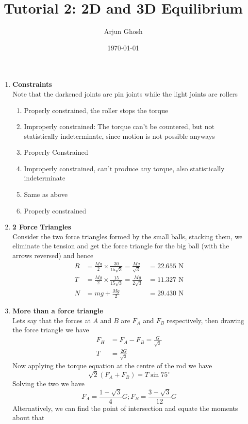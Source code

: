 \documentclass[12pt]{article}
\title{Tutorial 2: 2D and 3D Equilibrium}
\author{Arjun Ghosh}
\date{\today}
\begin{document}
\maketitle
\begin{enumerate}
\item \textbf{Constraints} \\
Note that the darkened joints are pin joints while the light joints are rollers
\begin{enumerate}
\item Properly constrained, the roller stops the torque
\item Improperly constrained: The torque can't be countered, but not statistically indeterminate, since motion is not possible anyways
\item Properly Constrained
\item Improperly constrained, can't produce any torque, also statistically indeterminate
\item Same as above
\item Properly constrained
\end{enumerate}
\item \textbf{2 Force Triangles} \\
Consider the two force triangles formed by the small balls, stacking them, we eliminate the tension and get the force triangle for the big ball (with the arrows reversed) and hence
$$
\begin{aligned}
R &= \frac{Mg}{2} \times \frac{30}{15\sqrt{ 3 }} = \frac{Mg}{\sqrt{ 3 }} & =22.655 \text{ N}\\
T &= \frac{Mg}{2}\times \frac{15}{15\sqrt{ 3 } } = \frac{Mg}{2\sqrt{ 3 }} &=11.327 \text{ N}\\
N &= mg + \frac{Mg}{2} &= 29.430 \text{ N}
\end{aligned}
$$
\item \textbf{More than a force triangle} \\
Lets say that the forces at $A$ and $B$ are $F_{A}$ and $F_{B}$ respectively, then drawing the force triangle we have
$$
\begin{aligned}
F_{H}  & = F_{A}-F_{B} = \frac{G}{\sqrt{ 3 }} \\
T  & =\frac{2G}{\sqrt{ 3 }}
\end{aligned}
$$
Now applying the torque equation at the centre of the rod we have
$$
\sqrt{ 2 }(F_{A} + F_{B}) = T \sin 75^{\circ}
$$
Solving the two we have
$$
F_{A} = \frac{1 + \sqrt{ 3 }}{4}G; F_{B} = \frac{3-\sqrt{ 3 }}{12}G
$$
Alternatively, we can find the point of intersection and equate the moments about that

\end{enumerate}
\end{document}
